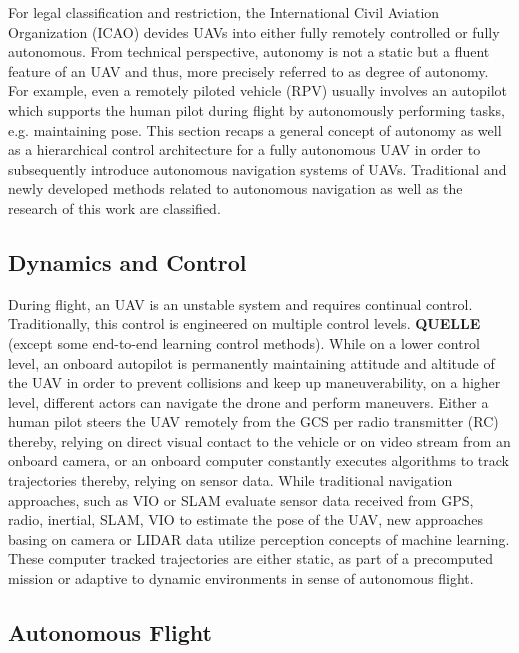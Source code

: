For legal classification and restriction,
the International Civil Aviation Organization (ICAO)
devides UAVs into either fully remotely controlled 
or fully autonomous.
From technical perspective,
autonomy is not a static
but a fluent feature of an UAV
and thus, more precisely referred to as
degree of autonomy. For example,
even a remotely piloted vehicle (RPV)
usually involves an autopilot
which supports the human pilot
during flight by autonomously
performing tasks, e.g. maintaining pose.
This section recaps a general
concept of autonomy as well as
a hierarchical control architecture for a
fully autonomous UAV in order to
subsequently introduce
autonomous navigation systems of UAVs.
Traditional and newly developed methods
related to autonomous navigation
as well as 
the research of this work are classified.





\subsection{Dynamics and Control}

During flight, an UAV is an unstable system
and requires continual control.
Traditionally, this control is
engineered on multiple control levels.
\textbf{QUELLE}
(except some end-to-end learning control methods).
While on a lower control level,
an onboard autopilot is 
permanently maintaining attitude and altitude of the UAV
in order to prevent 
collisions and keep up maneuverability,
on a higher level, different actors 
can navigate the drone and perform maneuvers.
Either a human pilot steers the UAV remotely from
the GCS per radio transmitter (RC)
thereby, relying on direct visual contact to the vehicle 
or on video stream from an onboard camera,
or an onboard computer constantly executes 
algorithms to track trajectories
thereby, relying on sensor data.
While traditional navigation approaches,
such as VIO or SLAM
evaluate sensor data received from
GPS, radio, inertial, SLAM, VIO
to estimate the pose of the UAV,
new approaches basing
on camera or LIDAR data utilize perception concepts
of machine learning.
These computer tracked trajectories 
are either static,
as part of a
precomputed mission or 
adaptive to dynamic environments
in sense of autonomous flight.


\subsection{Autonomous Flight}

